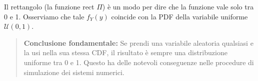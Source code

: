 \begin{center}
\end{center}

Il rettangolo (la funzione rect $\Pi$) è un modo per dire che la funzione vale solo tra 0 e 1.
Osserviamo che tale $f_Y(y)$ coincide con la PDF della variabile uniforme $\mathcal{U}(0, 1)$.

\begin{quote}
\textbf{Conclusione fondamentale:} Se prendi una variabile aleatoria qualsiasi e la usi nella sua stessa CDF, il risultato è sempre una distribuzione uniforme tra 0 e 1. Questo ha delle notevoli conseguenze nelle procedure di simulazione dei sistemi numerici.
\end{quote}